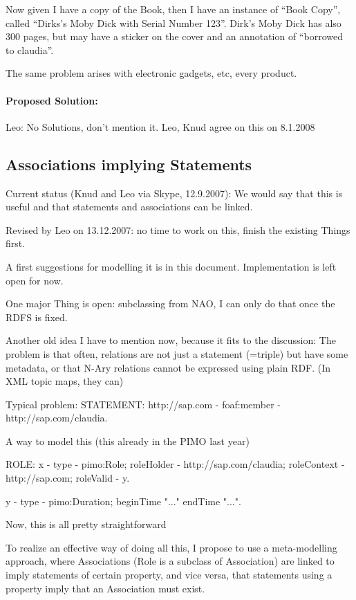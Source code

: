 Now given I have a copy of the Book, then I have an instance of ``Book Copy'',
called ``Dirks's Moby Dick with Serial Number 123''.
Dirk's Moby Dick has also 300 pages, but may have a sticker on the cover
and an annotation of ``borrowed to claudia''.

The same problem arises with electronic gadgets, etc, every product.

\paragraph{Proposed Solution:} Leo: No Solutions, don't mention it.
Leo, Knud agree on this on 8.1.2008


\subsection{Associations implying Statements}
Current status (Knud and Leo via Skype, 12.9.2007):
We would say that this is useful and that statements and associations can be linked.

Revised by Leo on 13.12.2007: no time to work on this, finish the existing Things first.

A first suggestions for modelling it is in this document. 
Implementation is left open for now.

One major Thing is open:
subclassing from NAO,
I can only do that once the RDFS is fixed.

Another old idea I have to mention now, because it fits to the discussion:
The problem is that often, relations are not just a statement (=triple) but have some metadata,
or that N-Ary relations cannot be expressed using plain RDF. (In XML topic maps, they can)

Typical problem:
STATEMENT:
http://sap.com - foaf:member - http://sap.com/claudia.

A way to model this (this already in the PIMO last year)

ROLE:
x - type - pimo:Role;
 roleHolder - http://sap.com/claudia;
 roleContext - http://sap.com;
 roleValid - y.

y - type - pimo:Duration;
 beginTime "..."
 endTime "...".

Now, this is all pretty straightforward

To realize an effective way of doing all this, I propose to use a meta-modelling approach, where Associations (Role is a subclass of Association) are linked to imply statements of  certain property, and vice versa, that statements using a property imply that an Association must exist.

